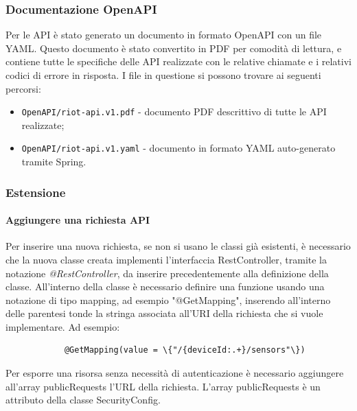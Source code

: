 	\subsubsection{Documentazione OpenAPI}

	Per le API è stato generato un documento in formato OpenAPI con un file YAML. Questo documento è stato convertito in PDF per comodità di lettura, e contiene tutte le specifiche delle API realizzate con le relative chiamate e i relativi codici di errore in risposta.
	\newline
	I file in questione si possono trovare ai seguenti percorsi:
	\begin{itemize}
		\item \verb!OpenAPI/riot-api.v1.pdf! - documento PDF descrittivo di tutte le API realizzate;
		\item \verb!OpenAPI/riot-api.v1.yaml! - documento in formato YAML auto-generato tramite Spring.
	\end{itemize}
	
	\subsubsection{Estensione}
		\paragraph{Aggiungere una richiesta API}
			Per inserire una nuova richiesta, se non si usano le classi già esistenti, è necessario che la nuova classe creata implementi l'interfaccia RestController, tramite la notazione \textit{@RestController}, da inserire precedentemente alla definizione della classe.
			\newline
			All'interno della classe è necessario definire una funzione usando una notazione di tipo mapping, ad esempio "@GetMapping", inserendo all'interno delle parentesi tonde la stringa associata all'URI della richiesta che si vuole implementare.
			Ad esempio:
			\begin{verbatim}
			@GetMapping(value = \{"/{deviceId:.+}/sensors"\})
			\end{verbatim}
			Per esporre una risorsa senza necessità di autenticazione è necessario aggiungere all'array publicRequests l'URL della richiesta. L'array publicRequests è un attributo della classe SecurityConfig.